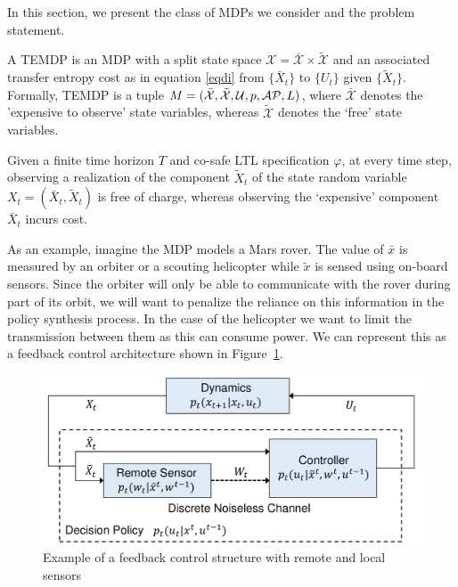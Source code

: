 In this section, we present the class of MDPs we consider and the problem statement.  

  A TEMDP is an MDP with a split state space $\mathcal{X} = \bar{\mathcal{X}} \times \tilde{\mathcal{X}} $ and an associated transfer entropy cost as in equation \eqref{eqdi} from $\{\bar{X}_t\}$ to $\{U_t\}$ given $\{\tilde{X}_t\}$. Formally, TEMDP is a tuple $M=(\bar{\mathcal{X}},\tilde{\mathcal{X}},\mathcal{U},p,\mathcal{AP},L)$, where  $\bar{\mathcal{X}}$ denotes the 'expensive to observe' state variables, whereas  $\tilde{\mathcal{X}}$ denotes the `free' state variables.
  
Given a finite time horizon $T$ and co-safe LTL specification $\varphi$, at every time step, observing a realization of the component $\tilde{X}_t$ of the state random variable $X_t=(\bar{X}_t, \tilde{X}_t)$ is free of charge, whereas observing the `expensive' component $\bar{X}_t$ incurs cost. 

%
As an example, imagine the MDP models a Mars rover. The value of $\bar{x}$ is measured by an orbiter or a scouting helicopter while $\tilde{x}$ is sensed using on-board sensors. Since the orbiter will only be able to communicate with the rover during part of its orbit, we will want to penalize the reliance on this information in the policy synthesis process. In the case of the helicopter we want to limit the transmission between them as this can consume power. We can represent this as a feedback control architecture shown in Figure~\ref{fig:NCS}. 
\begin{figure}
\centering
\includegraphics[width=\columnwidth]{comm.pdf}
\caption{Example of a feedback control structure with remote and local sensors}
\label{fig:NCS}
\end{figure}

